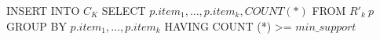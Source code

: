INSERT INTO $C_K$
SELECT $p.item_1, \ldots, p.item_k, COUNT (*)$
FROM $R'_k\ p$
GROUP BY $p.item_1, \ldots, p.item_k$
HAVING COUNT (*) >= $min\_support$